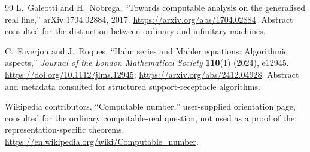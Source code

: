 \documentclass[11pt,letterpaper]{article}
\numberwithin{equation}{section}
\theoremstyle{definition}
\theoremstyle{remark}
\begin{document}
\begin{thebibliography}{99}
L.~Galeotti and H.~Nobrega, ``Towards computable analysis on the generalised
real line,'' arXiv:1704.02884, 2017.
\url{https://arxiv.org/abs/1704.02884}.
Abstract consulted for the distinction between ordinary and infinitary machines.

C.~Faverjon and J.~Roques, ``Hahn series and Mahler equations: Algorithmic
aspects,'' \emph{Journal of the London Mathematical Society} \textbf{110}(1)
(2024), e12945. \url{https://doi.org/10.1112/jlms.12945};
\url{https://arxiv.org/abs/2412.04928}.
Abstract and metadata consulted for structured support-receptacle algorithms.

Wikipedia contributors, ``Computable number,'' user-supplied orientation page,
consulted for the ordinary computable-real question, not used as a proof of
the representation-specific theorems.
\url{https://en.wikipedia.org/wiki/Computable_number}.

\end{thebibliography}
\end{document}
